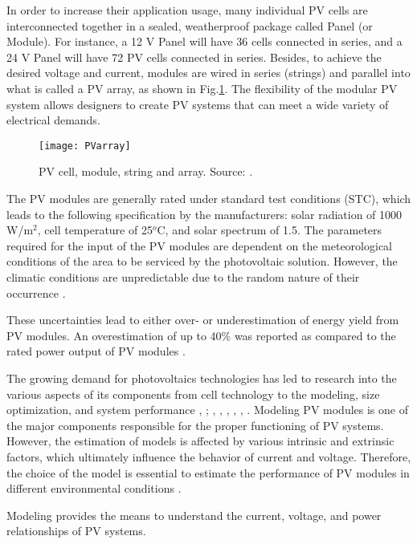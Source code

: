 In order to increase their application usage, many individual PV cells are interconnected together in a sealed, weatherproof package called Panel (or Module). For instance, a 12 V Panel will have 36 cells connected in series, and a 24 V Panel will have 72 PV cells connected in series. Besides, to achieve the desired voltage and current, modules are wired in series (strings) and parallel into what is called a PV array, as shown in Fig.\ref{fig:celmodarray}. The flexibility of the modular PV system allows designers to create PV systems that can meet a wide variety of electrical demands. 

\begin{figure}[h]
\texttt{[image: PVarray]}
\centering
\caption{PV cell, module, string and array. Source: \cite{SamlexSolar}.}
\label{fig:celmodarray}
\end{figure}

The PV modules are generally rated under standard test conditions (STC), which leads to the following specification by the manufacturers: solar radiation of 1000 W/m$^{2}$, cell temperature of 25$^{o}$C, and solar spectrum of 1.5. The parameters required for the input of the PV modules are dependent on the meteorological conditions of the area to be serviced by the photovoltaic solution. However, the climatic conditions are unpredictable due to the random nature of their occurrence \cite{Jakhrani}.
 
These uncertainties lead to either over- or underestimation of energy yield from PV modules. An overestimation of up to 40\% was reported as compared to the rated power output of PV modules \cite{Durisch}. 

The growing demand for photovoltaics technologies has led to research into the various aspects of its components from cell technology to the modeling, size optimization, and system performance \cite{Rajanna}, \cite{Badejani}; \cite{Yatimi}, \cite{Ferrari}, \cite{Saloux}, \cite{Hasan}, \cite{King}, \cite{Mellit}. Modeling PV modules is one of the major components responsible for the proper functioning of PV systems. However, the estimation of models is affected by various intrinsic and extrinsic factors, which ultimately influence the behavior of current and voltage. Therefore, the choice of the model is essential to estimate the performance of PV modules in different environmental conditions \cite{Jakhrani}.
 
Modeling provides the means to understand the current, voltage, and power relationships of PV systems.
  
